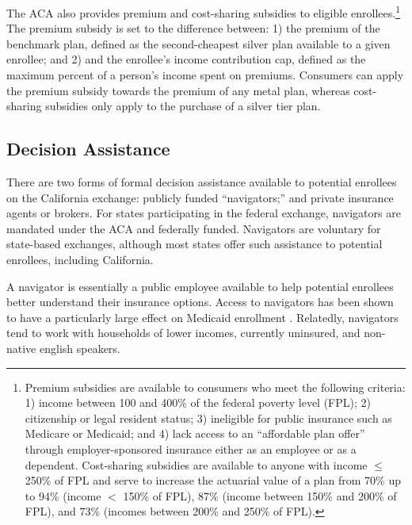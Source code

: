 \documentclass[12pt]{article}
\begin{document}
The ACA also provides premium and cost-sharing subsidies to eligible enrollees.\footnote{Premium subsidies are available to consumers who meet the following criteria: 1) income between 100 and 400\% of the federal poverty level (FPL); 2) citizenship or legal resident status; 3) ineligible for public insurance such as Medicare or Medicaid; and 4) lack access to an ``affordable plan offer'' through employer-sponsored insurance either as an employee or as a dependent. Cost-sharing subsidies are available to anyone with income $\leq$ 250\% of FPL and serve to increase the actuarial value of a plan from 70\% up to 94\% (income $<$ 150\% of FPL), 87\% (income between 150\% and 200\% of FPL), and 73\% (incomes between 200\% and 250\% of FPL).} The premium subsidy is set to the difference between: 1) the premium of the benchmark plan, defined as the second-cheapest silver plan available to a given enrollee; and 2) and the enrollee's income contribution cap, defined as the maximum percent of a person's income spent on premiums. Consumers can apply the premium subsidy towards the premium of any metal plan, whereas cost-sharing subsidies only apply to the purchase of a silver tier plan.

\subsection{Decision Assistance}
There are two forms of formal decision assistance available to potential enrollees on the California exchange: publicly funded ``navigators;'' and private insurance agents or brokers. For states participating in the federal exchange, navigators are mandated under the ACA and federally funded. Navigators are voluntary for state-based exchanges, although most states offer such assistance to potential enrollees, including California. 

A navigator is essentially a public employee available to help potential enrollees better understand their insurance options. Access to navigators has been shown to have a particularly large effect on Medicaid enrollment \citep{myerson2019, sommers2015, aizer2003}. Relatedly, navigators tend to work with households of lower incomes, currently uninsured, and non-native english speakers.
\end{document}
